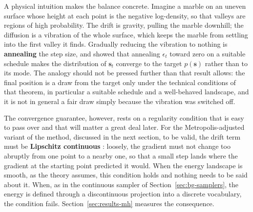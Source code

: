 A physical intuition makes the balance concrete. Imagine a marble on an uneven surface whose height at each point is the negative log-density, so that valleys are regions of high probability. The drift is gravity, pulling the marble downhill; the diffusion is a vibration of the whole surface, which keeps the marble from settling into the first valley it finds. Gradually reducing the vibration to nothing is \textbf{annealing} the step size, and \citet{welling2011bayesian} showed that annealing $\epsilon_t$ toward zero on a suitable schedule makes the distribution of $\bm{s}_t$ converge to the target $p(\bm{s})$ rather than to its mode. The analogy should not be pressed further than that result allows: the final position is a draw from the target only under the technical conditions of that theorem, in particular a suitable schedule and a well-behaved landscape, and it is not in general a fair draw simply because the vibration was switched off.

The convergence guarantee, however, rests on a regularity condition that is easy to pass over and that will matter a great deal later. For the Metropolis-adjusted variant of the method, discussed in the next section, to be valid, the drift term must be \textbf{Lipschitz continuous} \citep{roberts1996exponential}: loosely, the gradient must not change too abruptly from one point to a nearby one, so that a small step lands where the gradient at the starting point predicted it would. When the energy landscape is smooth, as the theory assumes, this condition holds and nothing needs to be said about it. When, as in the continuous sampler of Section~\ref{sec:bg-samplers}, the energy is defined through a discontinuous projection into a discrete vocabulary, the condition fails. Section~\ref{sec:results-mh} measures the consequence.

